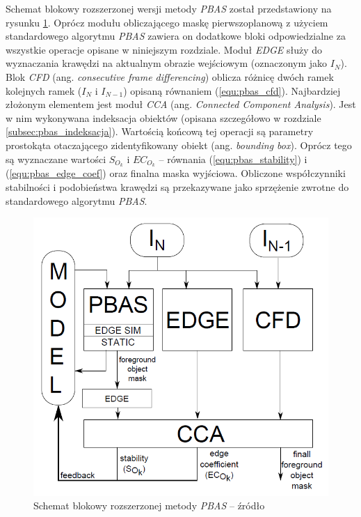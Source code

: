 
Schemat blokowy rozszerzonej wersji metody \textit{PBAS} został przedstawiony na rysunku \ref{fig:pbas_diagram}. 
Oprócz modułu obliczającego maskę pierwszoplanową z użyciem standardowego algorytmu \textit{PBAS} zawiera on dodatkowe bloki odpowiedzialne za wszystkie operacje opisane w niniejszym rozdziale. 
Moduł \textit{EDGE} służy do wyznaczania krawędzi na aktualnym obrazie wejściowym (oznaczonym jako $I_N$). 
Blok \textit{CFD} (ang. \textit{consecutive frame differencing}) oblicza różnicę dwóch ramek kolejnych ramek ($I_N$ i $I_{N-1}$) opisaną równaniem (\ref{equ:pbas_cfd}). 
Najbardziej złożonym elementem jest moduł \textit{CCA} (ang. \textit{Connected Component Analysis}). 
Jest w nim wykonywana indeksacja obiektów (opisana szczegółowo w rozdziale \ref{subsec:pbas_indeksacja}). 
Wartością końcową tej operacji są parametry prostokąta otaczającego zidentyfikowany obiekt (ang. \textit{bounding box}). 
Oprócz tego są wyznaczane wartości $S_{O_k}$ i $EC_{O_k}$ -- równania (\ref{equ:pbas_stability}) i (\ref{equ:pbas_edge_coef}) oraz finalna maska wyjściowa. 
Obliczone współczynniki stabilności i podobieństwa krawędzi są przekazywane jako sprzężenie zwrotne do standardowego algorytmu \textit{PBAS}.

 
	\begin{figure}[h]
		\centering
		\includegraphics[scale=0.6]{img/3/pbas_diagram.png}
		\caption{Schemat blokowy rozszerzonej metody \textit{PBAS} -- źródło \cite{kryjak_14_pbas}}
		\label{fig:pbas_diagram}
	\end{figure}



